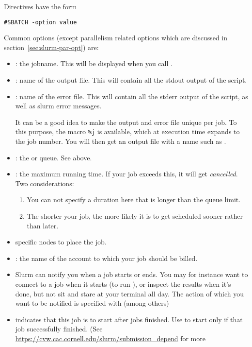 Directives have the form
\begin{verbatim}
#SBATCH -option value
\end{verbatim}
Common options
(except parallelism related options
which are discussed in section~\ref{sec:slurm-par-opt})
are:
\begin{itemize}
\item {}: the jobname. This will be displayed when you call .
\item {}: name of the output file. This will contain all the stdout output of the script.
\item {}: name of the error file. This will contain all the stderr
  output of the script, as well as slurm error messages.

  It can be a good idea to make the output and error file unique per job.
  To this purpose, the macro \verb+%j+ is available, which at execution time
  expands to the job number. You will then get an output file with a
  name such as .
\item {}: the  or queue. See above.
\item {}: the maximum running time.
  If your job exceeds this, it will get
  \emph{cancelled}. Two considerations:
  \begin{enumerate}
  \item You can not specify a duration here that is longer than the queue limit.
  \item The shorter your job, the more likely it is to get scheduled sooner
    rather than later.
  \end{enumerate}
\item {} specific nodes to place the job.
\item {}: the name of the account to which your job should be billed.
\item {} Slurm can notify you when a job starts or ends.
  You may for instance want to connect to a job when it starts
  (to run ),
  or inspect the results when it's done, but not sit and stare at your terminal all day.
  The action of which you want to be notified is specified with
  (among others)
\item {} indicates that this job is to
  start after jobs  finished. Use  to start only
  if that job successfully finished. (See
  \url{https://cvw.cac.cornell.edu/slurm/submission_depend} for more

\end{itemize}
